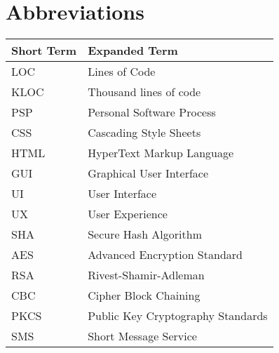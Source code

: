 \chapter{Abbreviations}




\begin{tabular}{p{40mm}|p{100mm}}
	\textbf{Short Term}&\textbf{Expanded Term}\\
	\hline
	LOC		&	Lines of Code\\
	KLOC	&	Thousand lines of code\\
	PSP		& 	Personal Software Process\\
	CSS 		& Cascading Style Sheets\\
	HTML 	& HyperText Markup Language\\
	GUI		& Graphical User Interface\\
	UI			& User Interface\\
	UX 		& User Experience\\
	SHA 		& Secure Hash Algorithm\\
	AES		& Advanced Encryption Standard\\
	RSA		& Rivest-Shamir-Adleman\\
	CBC 		& Cipher Block Chaining\\
	PKCS 	& Public Key Cryptography Standards\\
	SMS 		& Short Message Service\\
\end{tabular}